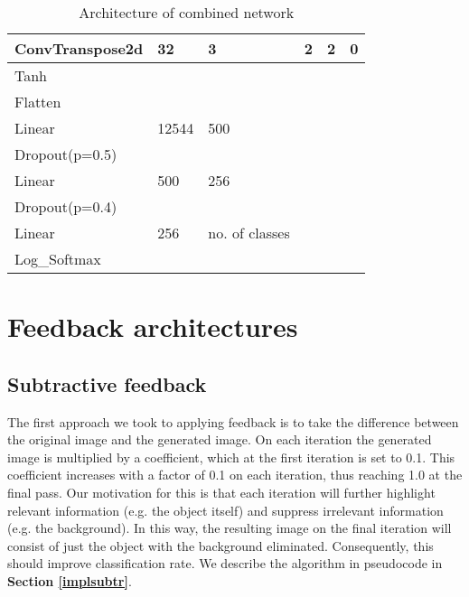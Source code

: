 \documentclass{l4proj}
\begin{document}
\begin{table}[H]
\begin{tabular}{|l|l|l|l|l|l|}
ConvTranspose2d & 32                    & 3                      & 2                     & 2               & 0                \\ \hline
Tanh            &                       &                        &                       &                 &                  \\ \hline
Flatten         &                       &                        &                       &                 &                  \\ \hline
Linear          & 12544                 & 500                    &                       &                 &                  \\ \hline
Dropout(p=0.5)  &                       &                        &                       &                 &                  \\ \hline
Linear          & 500                   & 256                    &                       &                 &                  \\ \hline
Dropout(p=0.4)  &                       &                        &                       &                 &                  \\ \hline
Linear          & 256                   & no. of classes         &                       &                 &                  \\ \hline
Log\_Softmax    &                       &                        &                       &                 &                  \\ \hline
\end{tabular}
\caption{Architecture of combined network}
\label{tab:combined}
\end{table}

\section{Feedback architectures}

\subsection{Subtractive feedback}
\label{app:subtractive}
The first approach we took to applying feedback is to take the difference between the original image and the generated image. On each iteration the generated image is multiplied by a coefficient, which at the first iteration is set to 0.1. This coefficient increases with a factor of 0.1 on each iteration, thus reaching 1.0 at the final pass. Our motivation for this is that each iteration will further highlight relevant information (e.g. the object itself) and suppress irrelevant information (e.g. the background). In this way, the resulting image on the final iteration will consist of just the object with the background eliminated. Consequently, this should improve classification rate.
We describe the algorithm in pseudocode in \textbf{Section \ref{implsubtr}}.
\end{document}
